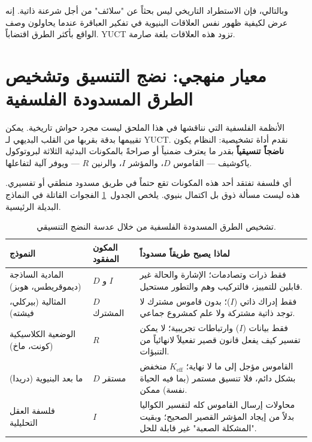 \documentclass[12pt,a4paper]{article}
\newcommand{\Keff}{K_{\mathrm{eff}}}
\begin{document}
	وبالتالي، فإن الاستطراد التاريخي ليس بحثاً عن "سلائف" من أجل شرعنة ذاتية. إنه عرض لكيفية ظهور نفس العلاقات البنيوية في تفكير العباقرة عندما يحاولون وصف الواقع بأكثر الطرق اقتضاباً. YUCT تزود هذه العلاقات بلغة صارمة.
	
	\section{معيار منهجي: نضج التنسيق وتشخيص الطرق المسدودة الفلسفية}
	\label{sec:methodological-criterion}
	
	الأنظمة الفلسفية التي نناقشها في هذا الملحق ليست مجرد حواش تاريخية. يمكن تقييمها بدقة بقربها من القلب البديهي لـ YUCT. نقدم أداة تشخيصية: النظام يكون \textbf{ناضجاً تنسيقياً} بقدر ما يعترف ضمنياً أو صراحةً بالمكونات البدئية الثلاثة لبروتوكول ياكوشيف — القاموس \(D\)، والمؤشر \(I\)، والرنين \(R\) — ويوفر آلية لتفاعلها.
	
	أي فلسفة تفتقد أحد هذه المكونات تقع حتماً في طريق مسدود منطقي أو تفسيري. هذه ليست مسألة ذوق بل اكتمال بنيوي. يلخص الجدول~\ref{tab:dead-ends} الفجوات القاتلة في النماذج البديلة الرئيسية.
	
	\begin{table}[htbp]
		\centering
		\caption{تشخيص الطرق المسدودة الفلسفية من خلال عدسة النضج التنسيقي.}
		\label{tab:dead-ends}
		\small
		\begin{tabular}{p{3cm} p{5.5cm} p{5.5cm}}
			\toprule
			\textbf{النموذج} & \textbf{المكون المفقود} & \textbf{لماذا يصبح طريقاً مسدوداً} \\
			\midrule
			المادية الساذجة (ديموقريطس، هوبز) & \(D\) و \(I\) & فقط ذرات وتصادمات؛ الإشارة والحالة غير قابلين للتمييز، فالتركيب وهم والتطور مستحيل. \\
			المثالية (بيركلي، فيشته) & \(D\) المشترك & فقط إدراك ذاتي (\(I\))؛ بدون قاموس مشترك لا توجد ذاتية مشتركة ولا علم كمشروع جماعي. \\
			الوضعية الكلاسيكية (كونت، ماخ) & \(R\) & فقط بيانات (\(I\)) وارتباطات تجريبية؛ لا يمكن تفسير كيف يفعل قانون قصير تفعيلاً لانهائياً من التنبؤات. \\
			ما بعد البنيوية (دريدا) & \(D\) مستقر & القاموس مؤجل إلى ما لا نهاية؛ \(\Keff\) منخفض بشكل دائم، فلا تنسيق مستمر (بما فيه الحياة نفسة) ممكن. \\
			فلسفة العقل التحليلية & \(I\) & محاولات إرسال القاموس كله لتفسير الكواليا بدلاً من إيجاد المؤشر القصير الصحيح؛ وبقيت "المشكلة الصعبة" غير قابلة للحل. \\
			\bottomrule
		\end{tabular}
	\end{table}
	
\end{document}
